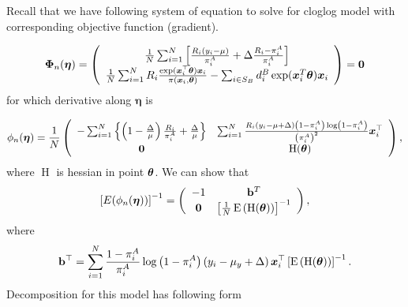 \documentclass[
  letterpaper,
  DIV=11,
  numbers=noendperiod]{scrreprt}
\begin{document}
Recall that we have following system of equation to solve for cloglog
model with corresponding objective function (gradient).

\[
\begin{equation*}
\boldsymbol{\Phi}_n(\boldsymbol{\eta})=\left(\begin{array}{c}
\frac{1}{N} \sum_{i=1}^N\left[\frac{R_i\left(y_i-\mu\right)}{\pi_i^A}+\Delta \frac{R_i-\pi_i^A}{\pi_i^A}\right] \\
\frac{1}{N}\sum_{i=1}^N R_i \frac{\exp(\bx_{i}^{\top}\btheta)\bx_{i}}{\pi(\bx_{i}, \btheta)} - \sum_{i \in S_{B}}d_{i}^{B}\exp(\bx_{i}^{T}\btheta)\bx_{i}
\end{array}\right) = \bZero
\end{equation*}
\] for which derivative along \(\boldsymbol{\eta}\) is

\[
\begin{equation*}
\phi_n(\boldsymbol{\eta})=\frac{1}{N}\left(\begin{array}{cc}
-\sum_{i=1}^N\left\{\left(1-\frac{\Delta}{\mu}\right) \frac{R_i}{\pi_i^A}+\frac{\Delta}{\mu}\right\} & \sum_{i=1}^N \frac{R_i\left(y_i-\mu + \Delta\right)\left(1 - \pi_i^A\right)\log \left(1 - \pi_i^A\right)}{\left(\pi_i^A\right)^2} \boldsymbol{x}_i^{\top} \\
\mathbf{0} & \operatorname{H}(\btheta)
\end{array}\right),
\end{equation*}
\] where \(\operatorname{H}\) is hessian in point \(\boldsymbol{\theta}\). We can
show that \[
\begin{equation*}
\left[E(\phi_n(\boldsymbol{\eta}))\right]^{-1}=\left(\begin{array}{cc}
-1 & \mathbf{b}^T \\
\mathbf{0} & \left[\frac{1}{N}\operatorname{E}\left(\operatorname{H}(\btheta)\right)\right]^{-1}
\end{array}\right),
\end{equation*}
\] where \[
\mathbf{b}^{\top} = \sum_{i=1}^N \frac{1-\pi_i^A}{\pi_i^A} \log \left(1 - \pi_i^A\right) \left(y_i - \mu_y + \Delta\right) \boldsymbol{x}_i^{\top}\left[\operatorname{E}\left(\operatorname{H} (\boldsymbol{\theta})\right)\right]^{-1}.
\] Decomposition for this model has following form
\end{document}
